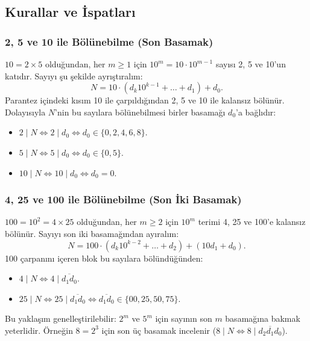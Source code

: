 \subsection{Kurallar ve İspatları}

\subsubsection{2, 5 ve 10 ile Bölünebilme (Son Basamak)}
$10 = 2 \times 5$ olduğundan, her $m \ge 1$ için $10^m = 10 \cdot 10^{m-1}$ sayısı 2, 5 ve 10'un katıdır. Sayıyı şu şekilde ayrıştıralım:
\[
N = 10 \cdot (d_k 10^{k-1} + \dots + d_1) + d_0.
\]
Parantez içindeki kısım 10 ile çarpıldığından 2, 5 ve 10 ile kalansız bölünür. Dolayısıyla $N$'nin bu sayılara bölünebilmesi birler basamağı $d_0$'a bağlıdır:
\begin{itemize}
    \item $2 \mid N \iff 2 \mid d_0 \iff d_0 \in \{0, 2, 4, 6, 8\}$.
    \item $5 \mid N \iff 5 \mid d_0 \iff d_0 \in \{0, 5\}$.
    \item $10 \mid N \iff 10 \mid d_0 \iff d_0 = 0$.
\end{itemize}

\subsubsection{4, 25 ve 100 ile Bölünebilme (Son İki Basamak)}
$100 = 10^2 = 4 \times 25$ olduğundan, her $m \ge 2$ için $10^m$ terimi 4, 25 ve 100'e kalansız bölünür. Sayıyı son iki basamağından ayıralım:
\[
N = 100 \cdot (d_k 10^{k-2} + \dots + d_2) + (10 d_1 + d_0).
\]
100 çarpanını içeren blok bu sayılara bölündüğünden:
\begin{itemize}
    \item $4 \mid N \iff 4 \mid \overline{d_1 d_0}$.
    \item $25 \mid N \iff 25 \mid \overline{d_1 d_0} \iff \overline{d_1 d_0} \in \{00, 25, 50, 75\}$.
\end{itemize}

Bu yaklaşım genelleştirilebilir: $2^m$ ve $5^m$ için sayının son $m$ basamağına bakmak yeterlidir. Örneğin $8 = 2^3$ için son üç basamak incelenir ($8 \mid N \iff 8 \mid \overline{d_2 d_1 d_0}$).

